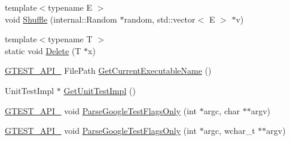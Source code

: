 \begin{DoxyCompactItemize}
\item 
{\footnotesize template$<$typename E $>$ }\\void \hyperlink{namespacetesting_1_1internal_a955e3f72f36c9db3a1165517010f52a3}{\-Shuffle} (internal\-::\-Random $\ast$random, std\-::vector$<$ \-E $>$ $\ast$v)
\item 
{\footnotesize template$<$typename T $>$ }\\static void \hyperlink{namespacetesting_1_1internal_a9e0b8eb07b3eef24b40b4bbe03bd11be}{\-Delete} (\-T $\ast$x)
\item 
\hyperlink{gtest-port_8h_aa73be6f0ba4a7456180a94904ce17790}{\-G\-T\-E\-S\-T\-\_\-\-A\-P\-I\-\_\-} \-File\-Path \hyperlink{namespacetesting_1_1internal_a4fc348184f2bc16ec2270cffb38de5dc}{\-Get\-Current\-Executable\-Name} ()
\item 
\-Unit\-Test\-Impl $\ast$ \hyperlink{namespacetesting_1_1internal_a3ae874a4030c4aa27d77d67bf08d9e1d}{\-Get\-Unit\-Test\-Impl} ()
\item 
\hyperlink{gtest-port_8h_aa73be6f0ba4a7456180a94904ce17790}{\-G\-T\-E\-S\-T\-\_\-\-A\-P\-I\-\_\-} void \hyperlink{namespacetesting_1_1internal_a5655276556ac09c8d184920553da3e90}{\-Parse\-Google\-Test\-Flags\-Only} (int $\ast$argc, char $\ast$$\ast$argv)
\item 
\hyperlink{gtest-port_8h_aa73be6f0ba4a7456180a94904ce17790}{\-G\-T\-E\-S\-T\-\_\-\-A\-P\-I\-\_\-} void \hyperlink{namespacetesting_1_1internal_ae231639ccb18f92df31567b3eca47ac9}{\-Parse\-Google\-Test\-Flags\-Only} (int $\ast$argc, wchar\-\_\-t $\ast$$\ast$argv)
\end{DoxyCompactItemize}
